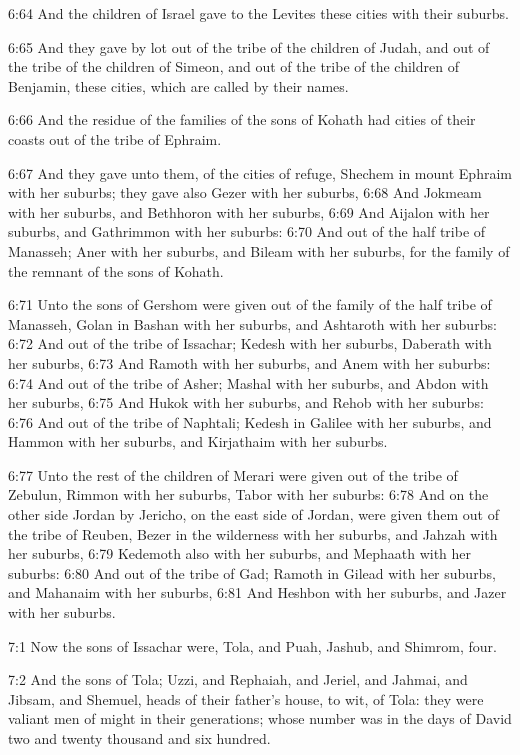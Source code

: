 6:64 And the children of Israel gave to the Levites these cities with
their suburbs.

6:65 And they gave by lot out of the tribe of the children of Judah,
and out of the tribe of the children of Simeon, and out of the tribe
of the children of Benjamin, these cities, which are called by their
names.

6:66 And the residue of the families of the sons of Kohath had cities
of their coasts out of the tribe of Ephraim.

6:67 And they gave unto them, of the cities of refuge, Shechem in
mount Ephraim with her suburbs; they gave also Gezer with her suburbs,
6:68 And Jokmeam with her suburbs, and Bethhoron with her suburbs,
6:69 And Aijalon with her suburbs, and Gathrimmon with her suburbs:
6:70 And out of the half tribe of Manasseh; Aner with her suburbs, and
Bileam with her suburbs, for the family of the remnant of the sons of
Kohath.

6:71 Unto the sons of Gershom were given out of the family of the half
tribe of Manasseh, Golan in Bashan with her suburbs, and Ashtaroth
with her suburbs: 6:72 And out of the tribe of Issachar; Kedesh with
her suburbs, Daberath with her suburbs, 6:73 And Ramoth with her
suburbs, and Anem with her suburbs: 6:74 And out of the tribe of
Asher; Mashal with her suburbs, and Abdon with her suburbs, 6:75 And
Hukok with her suburbs, and Rehob with her suburbs: 6:76 And out of
the tribe of Naphtali; Kedesh in Galilee with her suburbs, and Hammon
with her suburbs, and Kirjathaim with her suburbs.

6:77 Unto the rest of the children of Merari were given out of the
tribe of Zebulun, Rimmon with her suburbs, Tabor with her suburbs:
6:78 And on the other side Jordan by Jericho, on the east side of
Jordan, were given them out of the tribe of Reuben, Bezer in the
wilderness with her suburbs, and Jahzah with her suburbs, 6:79
Kedemoth also with her suburbs, and Mephaath with her suburbs: 6:80
And out of the tribe of Gad; Ramoth in Gilead with her suburbs, and
Mahanaim with her suburbs, 6:81 And Heshbon with her suburbs, and
Jazer with her suburbs.

7:1 Now the sons of Issachar were, Tola, and Puah, Jashub, and
Shimrom, four.

7:2 And the sons of Tola; Uzzi, and Rephaiah, and Jeriel, and Jahmai,
and Jibsam, and Shemuel, heads of their father's house, to wit, of
Tola: they were valiant men of might in their generations; whose
number was in the days of David two and twenty thousand and six
hundred.

